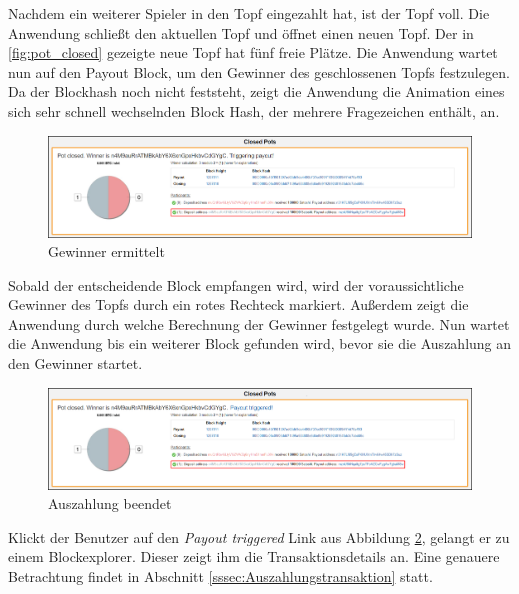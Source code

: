 Nachdem ein weiterer Spieler in den Topf eingezahlt hat, ist der Topf voll. Die Anwendung schließt den aktuellen Topf und öffnet einen neuen Topf. Der in \ref{fig:pot_closed} gezeigte neue Topf hat fünf freie Plätze. Die Anwendung wartet nun auf den Payout Block, um den Gewinner des geschlossenen Topfs festzulegen. Da der Blockhash noch nicht feststeht, zeigt die Anwendung die Animation eines sich sehr schnell wechselnden Block Hash, der mehrere Fragezeichen enthält, an.

\begin{figure}[H]
\centering
\includegraphics[width=1\linewidth]{Figures/btc_gui/pot_closed_triggering_payout}
\decoRule
\caption{Gewinner ermittelt}
\label{fig:pot_closed_triggering_payout}
\end{figure}
Sobald der entscheidende Block empfangen wird, wird der voraussichtliche Gewinner des Topfs durch ein rotes Rechteck markiert. Außerdem zeigt die Anwendung durch welche Berechnung der Gewinner festgelegt wurde. Nun wartet die Anwendung bis ein weiterer Block gefunden wird, bevor sie die Auszahlung an den Gewinner startet. 

\begin{figure}[H]
\centering
\includegraphics[width=1\linewidth]{Figures/btc_gui/pot_closed_payout_finished}
\decoRule
\caption{Auszahlung beendet}
\label{fig:pot_closed_payout_finished}
\end{figure}

Klickt der Benutzer auf den \emph{Payout triggered} Link aus Abbildung \ref{fig:pot_closed_payout_finished}, gelangt er zu einem Blockexplorer. Dieser zeigt ihm die Transaktionsdetails an. Eine genauere Betrachtung findet in Abschnitt \ref{sssec:Auszahlungstransaktion} statt.